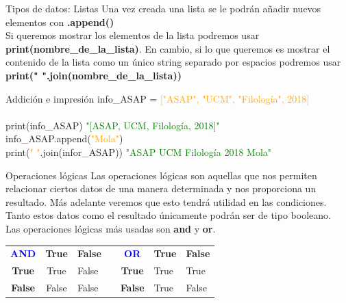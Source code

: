 \documentclass{beamer}
\begin{document}
\begin{frame}{Tipos de datos: Listas}
Una vez creada una lista se le podrán añadir nuevos elementos con \textbf{.append()}\\
Si queremos mostrar los elementos de la lista podremos usar \textbf{print(nombre\_de\_la\_lista)}. En cambio, si lo que queremos es mostrar el contenido de la lista como un único string separado por espacios podremos usar \textbf{print(" ".join(nombre\_de\_la\_lista))}
\begin{Programexample}{Addición e impresión}
info\_ASAP = \textcolor{orange}{["ASAP", "UCM", "Filología", 2018]}\\\\
print(info\_ASAP) \hspace{1.85cm} \textcolor{green}{"[ASAP, UCM, Filología, 2018]"}\\
info\_ASAP.append(\textcolor{orange}{"Mola"})\\
print(\textcolor{orange}{" "}.join(infor\_ASAP)) \hspace{0.4cm} \textcolor{green}{"ASAP UCM Filología 2018 Mola"}\\
\end{Programexample}
\end{frame}

\begin{frame}{Operaciones lógicas}
Las operaciones lógicas son aquellas que nos permiten relacionar ciertos datos de una manera determinada y nos proporciona un resultado. Más adelante veremos que esto tendrá utilidad en las condiciones.\\
Tanto estos datos como el resultado únicamente podrán ser de tipo booleano.\\
Las operaciones lógicas más usadas son \textbf{and} y \textbf{or}.
\begin{table}[]
\begin{tabular}{|c|c|l|l|c|l|l|}
\cline{1-3} \cline{5-7}
\textcolor{blue}{\textbf{AND}}   & \textbf{True}  & \textbf{False} &  & \textcolor{blue}{\textbf{OR}}    & \textbf{True} & \textbf{False} \\ \cline{1-3} \cline{5-7} 
\textbf{True}  & True  & False &  & \textbf{True}  & True & True  \\ \cline{1-3} \cline{5-7} 
\textbf{False} & False & False &  & \textbf{False} & True & False \\ \cline{1-3} \cline{5-7} 
\end{tabular}
\end{table}
\end{frame}
\end{document}
